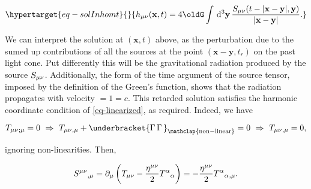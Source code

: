\documentclass[
  letterpaper,
  DIV=11,
  numbers=noendperiod,
  oneside]{scrreprt}
\begin{document}
\begin{equation}\protect\hypertarget{eq-solInhomt}{}{
\texttip{\texttip{h}{weak metric tensor}_{{\mu\nu}}}{weak covariant metric tensor component}(\mathbf{x},t) = 4\oldG\int\,\mathrm{d}^{3}\mathbf{y}\,\frac{\texttip{\texttip{S}{source tensor}_{\mu\nu}}{covariant source tensor component}(t-\vert\mathbf{x}-\mathbf{y} \vert,\mathbf{y})}{\vert\mathbf{x}-\mathbf{y} \vert}.
}\label{eq-solInhomt}\end{equation}

We can interpret the solution at \((\mathbf{x},t)\) above, as the
perturbation due to the sumed up contributions of all the sources at the
point \((\mathbf{x}-\mathbf{y},t_r)\) on the past light cone. Put
differently this will be the gravitational radiation produced by the
source
\(\texttip{\texttip{S}{source tensor}_{\mu\nu}}{covariant source tensor component}\).
Additionally, the form of the time argument of the source tensor,
imposed by the definition of the Green's function, shows that the
radiation propagates with velocity \(=1=c\). This retarded solution
satisfies the harmonic coordinate condition of \ref{eq-linearized}, as
required. Indeed, we have

\[
    \texttip{\texttip{T}{Stress-Energy tensor, or energy-momentum tensor}_{{\mu\nu}}}{covariant Stress-Energy tensor component}\texttip{{}_{;\mu}}{Covariant derivative}=0\ \Rightarrow\ \texttip{\texttip{T}{Stress-Energy tensor, or energy-momentum tensor}_{{\mu\nu}}}{covariant Stress-Energy tensor component}\texttip{{}_{,\mu}}{Partial derivative}+\underbracket{\Gamma\,\Gamma\,}_{\mathclap{\mathrm{non-linear}}}=0\ \Rightarrow\ \texttip{\texttip{T}{Stress-Energy tensor, or energy-momentum tensor}_{{\mu\nu}}}{covariant Stress-Energy tensor component}\texttip{{}_{,\mu}}{Partial derivative}=0,
\]

ignoring non-linearities. Then,

\[
    \texttip{\texttip{S}{source tensor}^{\mu\nu}}{contravariant source tensor component}\texttip{{}_{,\mu}}{Partial derivative} = \partial_\mu\left(\texttip{\texttip{T}{Stress-Energy tensor, or energy-momentum tensor}_{{\mu\nu}}}{covariant Stress-Energy tensor component}-\frac{\texttip{\texttip{\eta}{Minkoski metric tensor +---}^{\mu\nu}}{contravariant Minkoski metric components +---}}{2}\texttip{\texttip{T}{Stress-Energy tensor, or energy-momentum tensor}^{\alpha}{}_{\alpha}}{Stress-Energy tensor trace}\right) = -\frac{\texttip{\texttip{\eta}{Minkoski metric tensor +---}^{\mu\nu}}{contravariant Minkoski metric components +---}}{2}\texttip{\texttip{T}{Stress-Energy tensor, or energy-momentum tensor}^{\alpha}{}_{\alpha}}{Stress-Energy tensor trace}\texttip{{}_{,\mu}}{Partial derivative}.
\]
\end{document}
